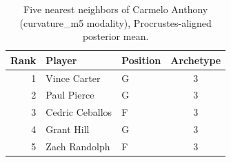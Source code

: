 \begin{table}[htbp]
  \centering\small
  \begin{tabular}{rllc}
    \toprule
    Rank & Player & Position & Archetype \\
    \midrule
    1 & Vince Carter & G & 3 \\
    2 & Paul Pierce & G & 3 \\
    3 & Cedric Ceballos & F & 3 \\
    4 & Grant Hill & G & 3 \\
    5 & Zach Randolph & F & 3 \\
    \bottomrule
  \end{tabular}
  \caption{Five nearest neighbors of Carmelo Anthony (curvature_m5 modality), Procrustes-aligned posterior mean.}
  \label{tab:Carmelo_Anthony_neighbors_curvature_m5}
\end{table}


